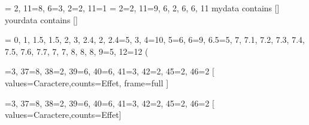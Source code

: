 \documentclass{article}
\begin{document}
   \StatsSortData \mydata = { 2, 11=8, 6=3, 2=2, 11=1 }
 \def \rawdata { 2=2, 11=9, 6, 2, 6, 6, 11}
 \StatsSortData \yourdata = \rawdata
 mydata contains [\mydata]\\
 yourdata contains [\yourdata]
   
 \StatsRangeData \facebook = { 0, 1, 1.5, 1.5, 2, 3, 2.4, 2, 2.4=5,
 3, 4=10, 5=6, 6=9, 6.5=5, 7, 7.1, 7.2,
 7.3, 7.4, 7.5, 7.6, 7.7, 7, 7, 8, 8, 8,
 9=5, 12=12}
 (\IN[0;1;[, \IN[1;2;[, \IN[2;4;[,
 \IN[4;7;[, \IN[7;10;[, \IN[10;14;[)




\statisticssetup{table/showonly/hidden=\color{white}#1}
 
 
 \StatsTable \facebook[ values=Caractere,counts=Effet, frequencies, frame=full, showonly=2-4 ]
 
 
 
 \def \combdata { 36=3, 37=8, 38=2, 39=6, 40=6, 41=3, 42=2, 45=2, 46=2 }
 \StatsTable \combdata[ values=Caractere,counts=Effet, frame=full ]
 
 \StatsGraph \combdata[ values=Caractere,counts=Effet]
\end{document}

